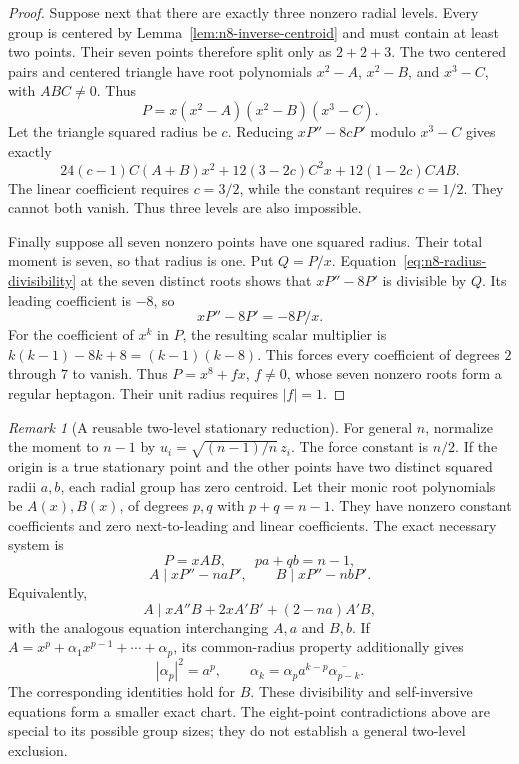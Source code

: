 \documentclass[11pt]{article}
\theoremstyle{remark}
\newtheorem{remark}[theorem]{Remark}
\numberwithin{equation}{section}
\begin{document}
\begin{proof}
Suppose next that there are exactly three nonzero radial levels.
Every group is centered by Lemma~\ref{lem:n8-inverse-centroid} and
must contain at least two points. Their seven points therefore split
only as $2+2+3$. The two centered pairs and centered triangle have
root polynomials $x^2-A$, $x^2-B$, and $x^3-C$, with $ABC\ne0$.
Thus
\[
                  P=x(x^2-A)(x^2-B)(x^3-C).
\]
Let the triangle squared radius be $c$. Reducing $xP''-8cP'$ modulo
$x^3-C$ gives exactly
\[
 24(c-1)C(A+B)x^2+12(3-2c)C^2x+12(1-2c)CAB.
\]
The linear coefficient requires $c=3/2$, while the constant requires
$c=1/2$. They cannot both vanish. Thus three levels are also impossible.

Finally suppose all seven nonzero points have one squared radius.
Their total moment is seven, so that radius is one. Put $Q=P/x$.
Equation~\eqref{eq:n8-radius-divisibility} at the seven distinct roots
shows that $xP''-8P'$ is divisible by $Q$. Its leading coefficient is
$-8$, so
\[
                      xP''-8P'=-8P/x.
\]
For the coefficient of $x^k$ in $P$, the resulting scalar multiplier
is $k(k-1)-8k+8=(k-1)(k-8)$. This forces every coefficient of degrees
$2$ through $7$ to vanish. Thus $P=x^8+fx$, $f\ne0$, whose seven
nonzero roots form a regular heptagon. Their unit radius requires
$|f|=1$.
\end{proof}

\begin{remark}[A reusable two-level stationary reduction]
For general $n$, normalize the moment to $n-1$ by
$u_i=\sqrt{(n-1)/n}\,z_i$. The force constant is $n/2$.
If the origin is a true stationary point and the other points have two
distinct squared radii $a,b$, each radial group has zero centroid.
Let their monic root polynomials be $A(x),B(x)$, of degrees $p,q$
with $p+q=n-1$. They have nonzero constant coefficients and zero
next-to-leading and linear coefficients. The exact necessary system is
\[
 P=xAB,\qquad pa+qb=n-1,
\]
\[
 A\mid xP''-naP',\qquad B\mid xP''-nbP'.
\]
Equivalently,
\[
 A\mid xA''B+2xA'B'+(2-na)A'B,
\]
with the analogous equation interchanging $A,a$ and $B,b$.
If $A=x^p+\alpha_1x^{p-1}+\cdots+\alpha_p$, its common-radius
property additionally gives
\[
 |\alpha_p|^2=a^p,\qquad
 \alpha_k=\alpha_p a^{k-p}\overline{\alpha_{p-k}}.
\]
The corresponding identities hold for $B$. These divisibility and
self-inversive equations form a smaller exact chart. The eight-point
contradictions above are special to its possible group sizes; they
do not establish a general two-level exclusion.
\end{remark}
\end{document}
